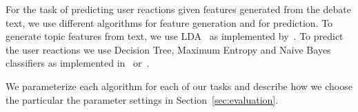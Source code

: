 
For the task of predicting user reactions given features generated from the debate text, we use different algorithms for feature generation and for prediction.  To generate topic features from text, we use LDA~\cite{blei_latent_2003} as implemented by~\cite{mccallum_mallet:_2002}.  To predict the user reactions we use Decision Tree, Maximum Entropy and Naive Bayes classifiers as implemented in~\cite{mccallum_mallet:_2002} or~\cite{bird_nltk:_2006}.

We parameterize each algorithm for each of our tasks and describe how we choose the particular the parameter settings in Section~\ref{sec:evaluation}.